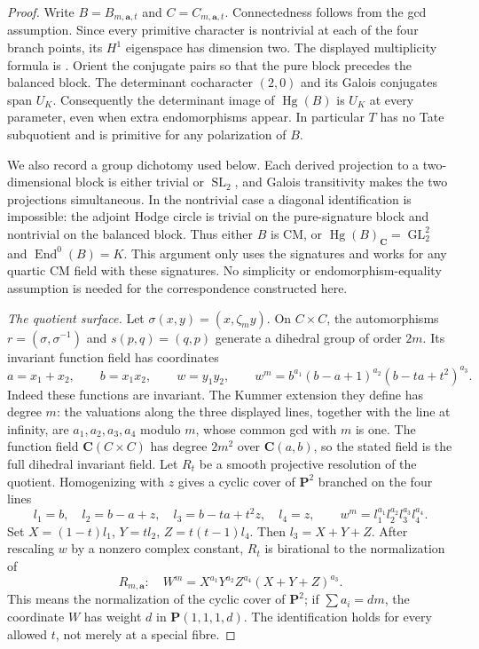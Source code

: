 \documentclass[11pt,reqno]{article}
\theoremstyle{emphasizedplain}
\theoremstyle{emphasizeddefinition}
\theoremstyle{emphasizeddefinition}
\DeclareMathOperator{\End}{End}
\DeclareMathOperator{\Hg}{Hg}
\DeclareMathOperator{\GL}{GL}
\DeclareMathOperator{\SL}{SL}
\newcommand{\C}{\mathbf C}
\begin{document}
\begin{proof}
Write $B=B_{m,\boldsymbol a,t}$ and $C=C_{m,\boldsymbol a,t}$.
Connectedness follows from the gcd assumption. Since every primitive
character is nontrivial at each of the four branch points, its
$H^1$ eigenspace has dimension two. The displayed multiplicity formula
is \cite[Lemma 2.7]{MoonenCyclic}. Orient the conjugate pairs so that
the pure block precedes the balanced block. The determinant cocharacter
$(2,0)$ and its Galois conjugates span $U_K$. Consequently the
determinant image of $\Hg(B)$ is $U_K$ at every parameter, even
when extra endomorphisms appear. In particular $T$ has no Tate
subquotient and is primitive for any polarization of $B$.

We also record a group dichotomy used below. Each derived projection
to a two-dimensional block is either trivial or $\SL_2$, and
Galois transitivity makes the two projections simultaneous. In the
nontrivial case a diagonal identification is impossible: the
adjoint Hodge circle is trivial on the pure-signature block and
nontrivial on the balanced block. Thus either $B$ is CM, or
$\Hg(B)_\C=\GL_2^2$ and $\End^0(B)=K$. This argument only
uses the signatures and works for any quartic CM field with these
signatures. No simplicity or endomorphism-equality assumption is
needed for the correspondence constructed here.

\emph{The quotient surface.} Let $\sigma(x,y)=(x,\zeta_m y)$.
On $C\times C$, the automorphisms
$r=(\sigma,\sigma^{-1})$ and $s(p,q)=(q,p)$ generate a dihedral
group of order $2m$. Its invariant function field has coordinates
\[
 a=x_1+x_2,\qquad b=x_1x_2,\qquad w=y_1y_2,
 \qquad w^m=b^{a_1}(b-a+1)^{a_2}(b-ta+t^2)^{a_3}.
\]
Indeed these functions are invariant. The Kummer extension they
define has degree $m$: the valuations along the three displayed
lines, together with the line at infinity, are $a_1,a_2,a_3,a_4$
modulo $m$, whose common gcd with $m$ is one. The function field
$\C(C\times C)$ has degree $2m^2$ over $\C(a,b)$, so the stated
field is the full dihedral invariant field.
Let $R_t$ be a smooth projective resolution of the quotient.
Homogenizing with $z$ gives a cyclic cover of $\mathbf P^2$
branched on the four lines
\[
 l_1=b,\quad l_2=b-a+z,\quad l_3=b-ta+t^2z,\quad l_4=z,
 \qquad w^m=l_1^{a_1}l_2^{a_2}l_3^{a_3}l_4^{a_4}.
\]
Set $X=(1-t)l_1$, $Y=t l_2$, $Z=t(t-1)l_4$.
Then $l_3=X+Y+Z$. After rescaling $w$ by a nonzero complex
constant, $R_t$ is birational to the normalization of
\[
 R_{m,\boldsymbol a}:\quad W^m=X^{a_1}Y^{a_2}Z^{a_4}(X+Y+Z)^{a_3}.
\]
This means the normalization of the cyclic cover of $\mathbf P^2$;
if $\sum a_i=dm$, the coordinate $W$ has weight $d$ in
$\mathbf P(1,1,1,d)$. The identification holds for every allowed $t$,
not merely at a special fibre.


\end{proof}
\end{document}
